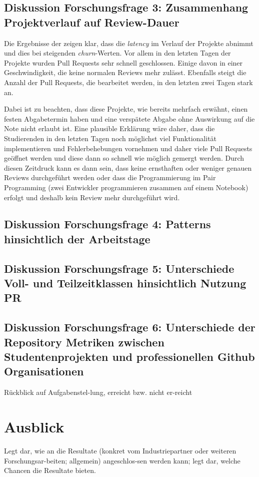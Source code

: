 \subsection{Diskussion Forschungsfrage 3: Zusammenhang Projektverlauf auf Review-Dauer}
Die Ergebnisse der  zeigen klar, dass die \textit{latency} im Verlauf der Projekte abnimmt und dies bei steigenden \textit{churn}-Werten. Vor allem in den letzten Tagen der Projekte wurden Pull Requests sehr schnell geschlossen. Einige davon in einer Geschwindigkeit, die keine normalen Reviews mehr zulässt.  Ebenfalls steigt die Anzahl der Pull Requests, die bearbeitet werden, in den letzten zwei Tagen stark an. 

Dabei ist zu beachten, dass diese Projekte, wie bereits mehrfach erwähnt, einen festen Abgabetermin haben und eine verspätete Abgabe ohne Auswirkung auf die Note nicht erlaubt ist. Eine plausible Erklärung wäre daher, dass die Studierenden in den letzten Tagen noch möglichst viel Funktionalität implementieren und Fehlerbehebungen vornehmen und daher viele Pull Requests geöffnet werden und diese dann so schnell wie möglich gemergt werden. Durch diesen Zeitdruck kann es dann sein, dass keine ernsthaften oder weniger genauen Reviews durchgeführt werden oder dass die Programmierung im Pair Programming (zwei Entwickler programmieren zusammen auf einem Notebook) erfolgt und deshalb kein Review mehr durchgeführt wird.

\subsection{Diskussion Forschungsfrage 4: Patterns hinsichtlich der Arbeitstage}
\subsection{Diskussion Forschungsfrage 5: Unterschiede Voll- und Teilzeitklassen hinsichtlich Nutzung PR}
\subsection{Diskussion Forschungsfrage 6: Unterschiede der Repository Metriken zwischen Studentenprojekten und professionellen Github Organisationen}


Rückblick auf Aufgabenstel-lung, erreicht bzw. nicht er-reicht

\section{Ausblick}
Legt dar, wie an die Resultate (konkret vom Industriepartner oder weiteren Forschungsar-beiten; allgemein) angeschlos-sen werden kann; legt dar, welche Chancen die Resultate bieten.




